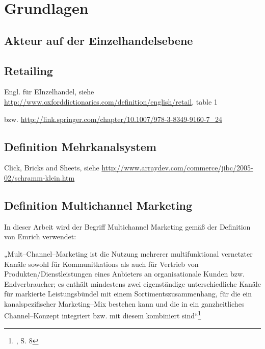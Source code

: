 \section{Grundlagen}
\label{sec:grundlagen}

\subsection{Akteur auf der Einzelhandelsebene}


\subsection{Retailing}

Engl. für EInzelhandel, siehe \url{http://www.oxforddictionaries.com/definition/english/retail}, table 1

bzw. \url{http://link.springer.com/chapter/10.1007/978-3-8349-9160-7_24}




\subsection{Definition Mehrkanalsystem}

Click, Bricks and Sheets, siehe \url{http://www.arraydev.com/commerce/jibc/2005-02/schramm-klein.htm}

\subsection{Definition Multichannel Marketing}

In dieser Arbeit wird der Begriff Multichannel Marketing gemäß der Definition von Emrich verwendet:

„Mult--Channel--Marketing ist die Nutzung mehrerer multifunktional vernetzter Kanäle sowohl für Kommunitkations als auch für Vertrieb von Produkten/Dienstleistungen eines Anbieters an organisationale Kunden bzw. Endverbraucher; es enthält mindestens zwei eigenständige unterschiedliche Kanäle für markierte Leistungsbündel mit einem Sortimentszusammenhang, für die ein kanalspezifischer Marketing--Mix bestehen kann und die in ein ganzheitliches Channel--Konzept integriert bzw. mit diesem kombiniert sind“\footnote{\cite{emrich}, S. 8}

